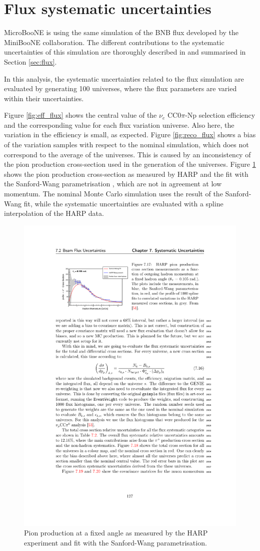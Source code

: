 \section{Flux systematic uncertainties}
MicroBooNE is using the same simulation of the BNB flux developed by the MiniBooNE collaboration. The different contributions to the systematic uncertainties of this simulation are thoroughly described in \cite{AguilarArevalo:2008yp} and summarised in Section \ref{sec:flux}.

In this analysis, the systematic uncertainties related to the flux simulation are evaluated by generating 100 universes, where the flux parameters are varied within their uncertainties. 

Figure \ref{fig:eff_flux} shows the central value of the $\nu_{e}$ CC0$\pi$-Np selection efficiency and the corresponding value for each flux variation universe. Also here, the variation in the efficiency is small, as expected. 
Figure \ref{fig:reco_flux} shows a bias of the variation samples with respect to the nominal simulation, which does not correspond to the average of the universes. This is caused by an inconsistency of the pion production cross-section used in the generation of the universes. 
Figure \ref{fig:harp} shows the pion production cross-section as measured by HARP \cite{Catanesi:2007ab} and the fit with the Sanford-Wang parametrisation \cite{Sanford:1967zza}, which are not in agreement at low momentum. The nominal Monte Carlo simulation uses the result of the Sanford-Wang fit, while the systematic uncertainties are evaluated with a spline interpolation of the HARP data.

\begin{figure}[htbp]
\centering  
\includegraphics[width=0.75\linewidth]{figures/harp.pdf}
\caption{Pion production at a fixed angle as measured by the HARP experiment and fit with the Sanford-Wang parametrisation.}\label{fig:harp}
\end{figure}

